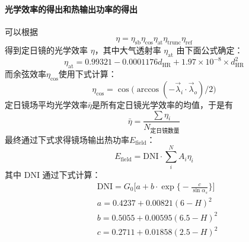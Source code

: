 \documentclass[../main.tex]{subfiles}
\begin{document}
\paragraph{光学效率的得出和热输出功率的得出}
可以根据
\begin{equation}
\eta = \eta _{\mathrm{s b}} \eta _{\cos} \eta _{\mathrm{at}} \eta _{\mathrm{trunc}} \eta _{\mathrm{ref}}
\end{equation}
得到定日镜的光学效率 \(\eta\)，其中大气透射率 \(\eta _{\mathrm{at}}\) 由下面公式确定：
\begin{equation}
\eta _{\mathrm{at}} = 0.99321 - 0.0001176 d _{\mathrm{HR}} + 1.97 \times 10 ^{-8} \times d _{\mathrm{HR}} ^{2}
\end{equation}
而余弦效率\(\eta _{\cos}\)使用下式计算：
\begin{equation}
\eta _{\cos} = \cos \big(\arccos (-\vec \lambda_{i} \cdot \vec \lambda_{o}) / 2\big)
\end{equation}
定日镜场平均光学效率\(\bar \eta\)是所有定日镜光学效率的均值，于是有
\begin{equation}
\bar \eta = \frac{\sum \eta_{i}}{N_{\text{定日镜数量}}}
\end{equation}
最终通过下式求得镜场输出热功率\(E_{\mathrm{field}}\)：
\begin{equation}
E_{\mathrm{field}} = \mathrm{DNI} \cdot \sum _{i} ^{N} A_{i} \eta _{i}
\end{equation}
其中 \(\mathrm{DNI}\) 通过下式计算：
\begin{equation}
\begin{aligned}
& \mathrm{DNI} = G_{0} \bigg[ a + b \cdot \exp\Big\{{-}\frac{c}{\sin \alpha_{s}}\Big\}\bigg]\\
& a = 0.4237 + 0.00821 (6 - H) ^{2} \\
& b = 0.5055 + 0.00595(6.5 - H) ^{2} \\
& c = 0.2711 + 0.01858 (2.5 - H) ^{2}
\end{aligned}
\end{equation}
\end{document}
